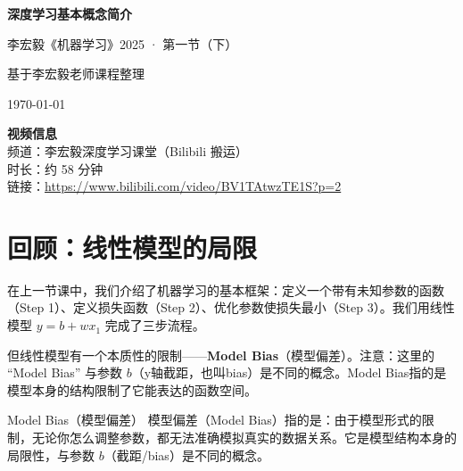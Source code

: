 \documentclass[a4paper]{article}
\newcommand{\notetitle}{深度学习基本概念简介}
\newcommand{\notesubtitle}{李宏毅《机器学习》2025 · 第一节（下）}
\newcommand{\noteauthors}{基于李宏毅老师课程整理}
\newcommand{\notedate}{\today}
\newcommand{\videochannel}{李宏毅深度学习课堂（Bilibili 搬运）}
\newcommand{\videoduration}{约 58 分钟}
\newcommand{\videourl}{https://www.bilibili.com/video/BV1TAtwzTE1S?p=2}
\begin{document}
\pagestyle{empty}

\begin{center}
    \vspace*{3cm}
    {\Huge\bfseries \notetitle\par}
    \vspace{0.5cm}
    {\LARGE \notesubtitle\par}
    \vspace{1.5cm}
    {\large \noteauthors\par}
    {\large \notedate\par}
    \vspace{1cm}
    \begin{tcolorbox}[width=0.8\textwidth,center,sharp corners,
                      colback=black!3!white,colframe=black!50!white]
        \centering
        \textbf{视频信息}\\[3pt]
        频道：\videochannel \\
        时长：\videoduration \\
        链接：\href{\videourl}{\videourl}
    \end{tcolorbox}
\end{center}

\newpage

\tableofcontents
\newpage

\pagestyle{plain}

\section{回顾：线性模型的局限}

在上一节课中，我们介绍了机器学习的基本框架：定义一个带有未知参数的函数（Step 1）、定义损失函数（Step 2）、优化参数使损失最小（Step 3）。我们用线性模型 $y = b + w x_1$ 完成了三步流程。

但线性模型有一个本质性的限制——\textbf{Model Bias}（模型偏差）。注意：这里的 ``Model Bias'' 与参数 $b$（y轴截距，也叫bias）是不同的概念。Model Bias指的是模型本身的结构限制了它能表达的函数空间。

\begin{importantbox}{Model Bias（模型偏差）}
    模型偏差（Model Bias）指的是：由于模型形式的限制，无论你怎么调整参数，都无法准确模拟真实的数据关系。它是模型结构本身的局限性，与参数 $b$（截距/bias）是不同的概念。
\end{importantbox}
\end{document}
